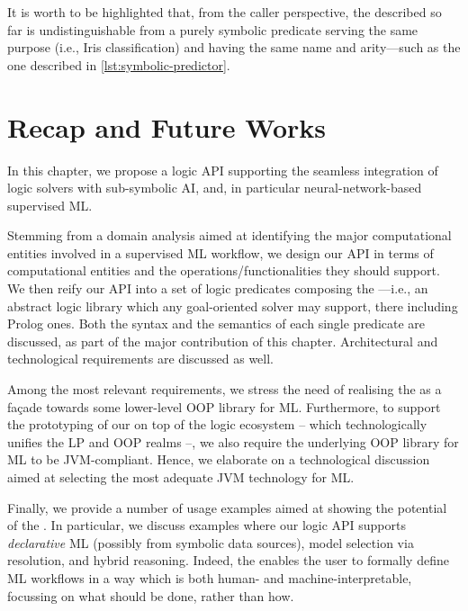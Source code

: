 \documentclass[12pt,a4paper,openright,twoside]{book}
\begin{document}
It is worth to be highlighted that, from the caller perspective, the  described so far is undistinguishable from a purely symbolic predicate serving the same purpose (i.e., Iris classification) and having the same name and arity---such as the one described in \cref{lst:symbolic-predictor}.



\section{Recap and Future Works}
\label{sec:conclusions3}

In this chapter, we propose a logic API supporting the seamless integration of logic solvers with sub-symbolic AI, and, in particular neural-network-based supervised ML.

Stemming from a domain analysis aimed at identifying the major computational entities involved in a supervised ML workflow, we design our API in terms of computational entities and the operations/functionalities they should support.
%
We then reify our API into a set of logic predicates composing the \mllib{}---i.e., an abstract logic library which any goal-oriented solver may support, there including Prolog ones.
%
Both the syntax and the semantics of each single predicate are discussed, as part of the major contribution of this chapter.
%
Architectural and technological requirements are discussed as well.

Among the most relevant requirements, we stress the need of realising the \mllib{} as a façade towards some lower-level OOP library for ML.
%
Furthermore, to support the prototyping of our \mllib{} on top of the \twopkt{} logic ecosystem -- which technologically unifies the LP and OOP realms --, we also require the underlying OOP library for ML to be JVM-compliant.
%
Hence, we elaborate on a technological discussion aimed at selecting the most adequate JVM technology for ML.

Finally, we provide a number of usage examples aimed at showing the potential of the \mllib{}.
%
In particular, we discuss examples where our logic API supports \emph{declarative} ML (possibly from symbolic data sources), model selection via resolution, and hybrid reasoning.
%
Indeed, the \mllib{} enables the user to formally define ML workflows in a way which is both human- and machine-interpretable, focussing on what should be done, rather than how.
\end{document}
